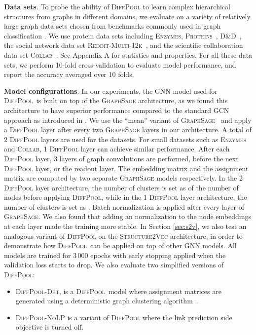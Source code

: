 \documentclass{article}
\newcommand{\xhdr}[1]{{\noindent\bfseries #1}.}
\newcommand{\name}{\textsc{DiffPool}\xspace}
\begin{document}
\xhdr{Data sets}
To probe the ability of \name to learn complex hierarchical structures from graphs in different domains, we evaluate on a variety of relatively large graph data sets chosen from benchmarks commonly used in graph classification \cite{KKMMN2016}. We use protein data sets including \textsc{Enzymes}, \textsc{Proteins}~\cite{Borgwardt2005a, Fer+2013}, \textsc{D\&D}~\cite{Dob+2003}, the social network data set \textsc{Reddit-Multi-12k}~\cite{Yan+2015a}, and the scientific collaboration data set \textsc{Collab}~\cite{Yan+2015a}. See Appendix A for statistics and properties.
For all these data sets, we perform 10-fold cross-validation to evaluate model performance, and report the accuracy averaged over 10 folds. 



\xhdr{Model configurations}
In our experiments, the GNN model used for \name\ is built on top of the \textsc{GraphSage} architecture, as we found this architecture to have superior performance compared to the standard GCN approach as introduced in \cite{kipf2017semi}. 
We use the ``mean'' variant of \textsc{GraphSage}~\cite{hamilton2017inductive} and apply a \name layer after every two \textsc{GraphSage} layers in our architecture.
A total of 2 \name layers are used for the datasets. For small datasets such as \textsc{Enzymes} and \textsc{Collab}, 1 \name layer can achieve similar performance.
After each \name layer, 3 layers of graph convolutions are performed, before the next \name layer, or the readout layer.
The embedding matrix and the assignment matrix are computed by two separate \textsc{GraphSage} models respectively.
In the 2 \name layer architecture, the number of clusters is set as  of the number of nodes before applying \name,
while in the 1 \name layer architecture, the number of clusters is set as .
Batch normalization \cite{ioffe2015batch} is applied after every layer of \textsc{GraphSage}. 
We also found that adding an  normalization to the node embeddings at each layer made the training more stable. 
In Section \ref{sec:s2v}, we also test an analogous variant of \name on the \textsc{Structure2Vec} \cite{dai2016discriminative} architecture, in order to demonstrate how \name\ can be applied on top of other GNN models. 
All models are trained for 3\,000 epochs with early stopping applied when the validation loss starts to drop.
We also evaluate two simplified versions of \name:
\begin{itemize}[leftmargin=15pt, topsep=-5pt, parsep=0pt]
 \item \textsc{\name-Det}, is a \name\ model where assignment matrices are generated using a deterministic graph clustering algorithm~\cite{dhillon2007weighted}.\item
    \textsc{DiffPool-NoLP} is a variant of \textsc{\name} where the link prediction side objective is turned off.
\end{itemize}
\end{document}
